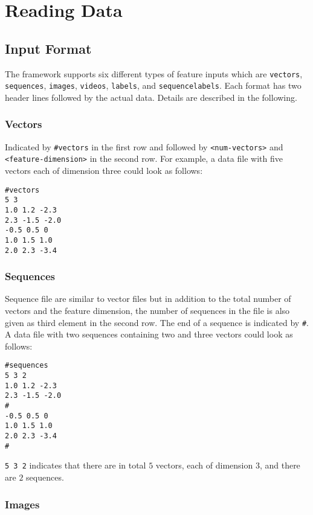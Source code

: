 \section{Reading Data}

\subsection{Input Format}

The framework supports six different types of feature inputs which are \texttt{vectors}, \texttt{sequences}, \texttt{images}, \texttt{videos}, \texttt{labels}, and \texttt{sequencelabels}.
Each format has two header lines followed by the actual data. Details are described in the following.

\subsubsection*{Vectors}

Indicated by \texttt{\#vectors} in the first row and followed by \texttt{<num-vectors>} and \texttt{<feature-dimension>} in the second row. For example, a data file with five vectors each of dimension three could look as follows:
\begin{verbatim}
#vectors
5 3
1.0 1.2 -2.3
2.3 -1.5 -2.0
-0.5 0.5 0
1.0 1.5 1.0
2.0 2.3 -3.4
\end{verbatim}

\subsubsection*{Sequences}

Sequence file are similar to vector files but in addition to the total number of vectors and the feature dimension, the number of sequences in the file is also given as third element in the second row. The end of a sequence is indicated by \texttt{\#}. A data file with two sequences containing two and three vectors could look as follows:
\begin{verbatim}
#sequences
5 3 2
1.0 1.2 -2.3
2.3 -1.5 -2.0
#
-0.5 0.5 0
1.0 1.5 1.0
2.0 2.3 -3.4
#
\end{verbatim}
\texttt{5 3 2} indicates that there are in total $ 5 $ vectors, each of dimension $ 3 $, and there are $ 2 $ sequences.

\subsubsection*{Images}

